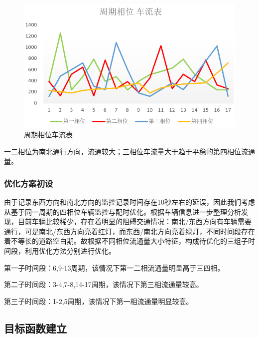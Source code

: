 \begin{figure}[H]
    \centering
    \includegraphics[scale=0.5]{figures/周期相位车流表.png}
    \caption{周期相位车流表}
    \label{fig:周期相位车流表}
\end{figure}
一二相位为南北通行方向，流通较大；三相位车流量大于趋于平稳的第四相位流通量。

\subsubsection{优化方案初设}
由于记录东西方向和南北方向的监控记录时间存在10秒左右的延误，因此我们考虑从基于同一周期的四相位车辆监控与配时优化。根据车辆信息进一步整理分析发现，目前车辆比较稀少，存在着明显的阻碍交通情况：南北/东西方向有车辆需要通行，可是南北/东西方向亮着红灯，而东西/南北方向亮着绿灯，不同时间段存在着不等长的道路空白期。故根据不同相位流通量大小特征，构成待优化的三组子时间段，利用优化方法分别进行优化。

第一子时间段：6,9-13周期，该情况下第一二相流通量明显高于三四相。

第二子时间段：3-4,7-8,14-17周期，该情况下第三相流通量较高。

第三子时间段：1-2,5周期，该情况下第一相流通量明显较高。

\subsection{目标函数建立}

